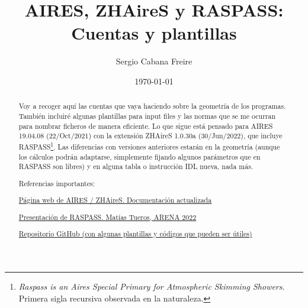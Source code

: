 \documentclass[a4paper,12pt]{article}
\title{\textbf{AIRES, ZHAireS y RASPASS: Cuentas y plantillas}}
\author{Sergio Cabana Freire}
\date{\today}
\numberwithin{equation}{section}
\numberwithin{figure}{section}
\begin{document}
   
	
	\maketitle
	\begin{abstract}
		Voy a recoger aquí las cuentas que vaya haciendo sobre la geometría de los programas. También incluiré algunas plantillas para input files y las normas que se me ocurran para nombrar ficheros de manera eficiente. Lo que sigue está pensado para AIRES 19.04.08 (22/Oct/2021) con la extensión ZHAireS 1.0.30a (30/Jun/2022), que incluye RASPASS\footnote{ \textit{Raspass is an Aires Special Primary for Atmospheric Skimming Showers}. Primera sigla recursiva observada en la naturaleza.}. Las diferencias con versiones anteriores estarán en la geometría (aunque los cálculos podrán adaptarse, simplemente fijando algunos parámetros que en RASPASS son libres) y en alguna tabla o instrucción IDL nueva, nada más.
		
		
		\vspace{10mm}
		Referencias importantes:
		
		\href{http://aires.fisica.unlp.edu.ar/}{Página web de AIRES / ZHAireS. Documentación actualizada}
		
		\href{https://indico.cern.ch/event/826366/contributions/4881703/attachments/2459764/4218361/Tueros-%20ARENA%2020222%20-%20RASPASS%20Showers.pdf}{Presentación de RASPASS. Matías Tueros, ARENA 2022}
		
		\href{https://github.com/SergioCabana/PhD_thesis}{Repositorio GitHub (con algunas plantillas y códigos que pueden ser útiles)}
	\end{abstract}
	\tableofcontents
	\newpage
	
\end{document}
